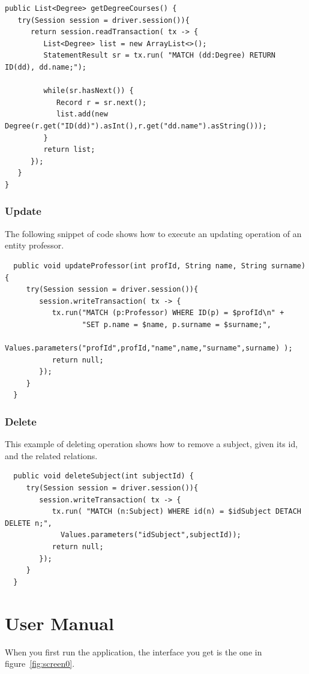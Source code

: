 \documentclass[a4paper]{article}
\begin{document}
\begin{verbatim}
public List<Degree> getDegreeCourses() {
   try(Session session = driver.session()){
      return session.readTransaction( tx -> {
         List<Degree> list = new ArrayList<>();
         StatementResult sr = tx.run( "MATCH (dd:Degree) RETURN ID(dd), dd.name;");
			
         while(sr.hasNext()) {
            Record r = sr.next();
            list.add(new Degree(r.get("ID(dd)").asInt(),r.get("dd.name").asString()));
         }
         return list;
      });
   }
}
\end{verbatim}


\subsubsection{Update}
The following snippet of code shows how to execute an updating operation of an entity professor.
\begin{verbatim}
  public void updateProfessor(int profId, String name, String surname) {
     try(Session session = driver.session()){
        session.writeTransaction( tx -> {
           tx.run("MATCH (p:Professor) WHERE ID(p) = $profId\n" + 
                  "SET p.name = $name, p.surname = $surname;",
             Values.parameters("profId",profId,"name",name,"surname",surname) );
           return null;
        });
     }
  }
\end{verbatim}

\subsubsection{Delete}
This example of deleting operation shows how to remove a subject, given its id, and the related relations.

\begin{verbatim}
  public void deleteSubject(int subjectId) {
     try(Session session = driver.session()){
        session.writeTransaction( tx -> {
           tx.run( "MATCH (n:Subject) WHERE id(n) = $idSubject DETACH DELETE n;",
             Values.parameters("idSubject",subjectId));
           return null;
        });
     }
  }
\end{verbatim}
\clearpage
\section{User Manual}
When you first run the application, the interface you get is the one in figure~\ref{fig:screen0}. 
\end{document}

